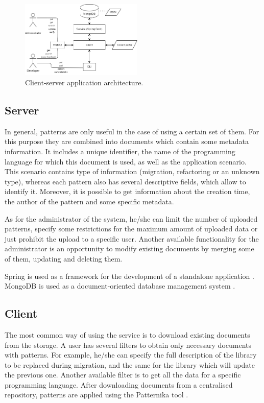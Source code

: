 \documentclass[letterpaper, 10 pt, conference]{ieeeconf}  %
\begin{document}
\begin{figure}[hbtp]
    \centerline{\includegraphics[width=0.52\textwidth]{arch}}
    \caption{Client-server application architecture.}
    \label{fig:architecture}
\end{figure}

\subsection{Server}
In general, patterns are only useful in the case of using a certain set of them.
For this purpose they are combined into documents which contain some metadata
information.
It includes a unique identifier, the name of the programming language for which
this document is used, as well as the application scenario. 
This scenario contains type of information (migration, refactoring or an unknown
type), whereas each pattern also has several descriptive fields, which allow 
to identify it.
Moreover, it is possible to get information about the creation time, the author
of the pattern and some specific metadata.

As for the administrator of the system, he/she can limit the number of uploaded
patterns, specify some restrictions for the maximum amount of uploaded data 
or just prohibit the upload to a specific user. 
Another available functionality for the administrator is an opportunity to
modify existing documents by merging some of them, updating and deleting them.

Spring is used as a framework for the development of a standalone 
application \cite{c5}.
MongoDB is used as a document-oriented database management system \cite{c6}. 

\subsection{Client}
The most common way of using the service is to download existing documents 
from the storage. 
A user has several filters to obtain only necessary documents with patterns. 
For example, he/she can specify the full description of the library to be
replaced during migration, and the same for the library which will update 
the previous one. 
Another available filter is to get all the data for a specific programming
language. 
After downloading documents from a centralised repository, patterns are 
applied using the Patternika tool \cite{c1}. 
\end{document}
